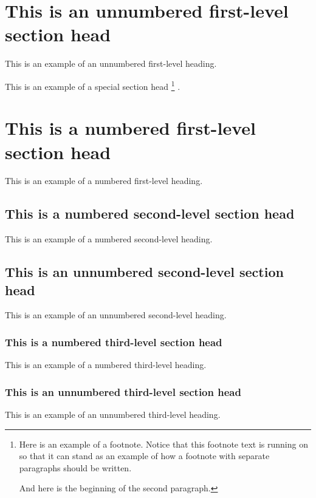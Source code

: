 \section*{This is an unnumbered first-level section head}
This is an example of an unnumbered first-level heading.

This is an example of a special section head%
\footnote{Here is an example of a footnote. Notice that this footnote
text is running on so that it can stand as an example of how a footnote
with separate paragraphs should be written.
\par
And here is the beginning of the second paragraph.}%
.

\section{This is a numbered first-level section head}
This is an example of a numbered first-level heading.

\subsection{This is a numbered second-level section head}
This is an example of a numbered second-level heading.

\subsection*{This is an unnumbered second-level section head}
This is an example of an unnumbered second-level heading.

\subsubsection{This is a numbered third-level section head}
This is an example of a numbered third-level heading.

\subsubsection*{This is an unnumbered third-level section head}
This is an example of an unnumbered third-level heading.

